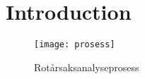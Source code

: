 \chapter{Introduction}
\label{chap:introduction}

\begin{figure}[h]
    \centering
    \texttt{[image: prosess]}
    \label{fig:prosess}
    \caption[RCA-prosess]{Rotårsaksanalyseprosess}
\end{figure}





  